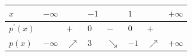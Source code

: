 \documentclass[border=.4pt]{standalone}
\begin{document}
\color{ink}\begin{tabular}{|>{\centering\arraybackslash}m{1.7cm}|>{\centering\arraybackslash}m{1.25cm}|>{\centering\arraybackslash}m{1.25cm}|>{\centering\arraybackslash}m{1.25cm}|>{\centering\arraybackslash}m{1.25cm}|>{\centering\arraybackslash}m{1.25cm}|>{\centering\arraybackslash}m{1.25cm}|>{\centering\arraybackslash}m{1.25cm}|}\hline
\cellcolor{head}$x$ & \cellcolor{head}$-\infty$ & \cellcolor{head} & \cellcolor{head}$-1$ & \cellcolor{head} & \cellcolor{head}$1$ & \cellcolor{head} & \cellcolor{head}$+\infty$ \\ \hline
\cellcolor{head}$p^{\prime}(x)$ &  & $+$ & $0$ & $-$ & $0$ & $+$ &  \\ \hline
\cellcolor{head}$p(x)$ & $-\infty$ & \color{focus}\large $\nearrow$ & $3$ & \color{focus}\large $\searrow$ & $-1$ & \color{focus}\large $\nearrow$ & $+\infty$ \\ \hline\end{tabular}
\end{document}
